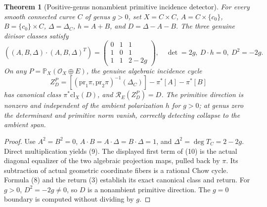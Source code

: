 \documentclass[11pt]{article}
\newtheorem{theorem}{Theorem}
\begin{document}
\begin{theorem}[Positive-genus nonambient primitive incidence detector]
For every smooth connected curve \(C\) of genus \(g>0\), set
\(X=C\times C\), \(A=C\times\{c_0\}\),
\(B=\{c_0\}\times C\), \(\Delta=\Delta_C\),
\(h=A+B\), and \(D=\Delta-A-B\).
The three genuine divisor classes satisfy
\[
 \left((A,B,\Delta)\cdot(A,B,\Delta)^T\right)
 =\begin{pmatrix}
 0&1&1\\ 1&0&1\\1&1&2-2g
 \end{pmatrix},\quad
 \boxed{\det=2g,\ D\cdot h=0,\ D^2=-2g.} \tag{9}
\]
On any \(P=\mathbb P_X(\mathcal O_X\oplus E)\), the
genuine algebraic incidence cycle
\[
 \boxed{Z_D^P=
 [( \mathrm{pr}_1\pi,\mathrm{pr}_2\pi)^{-1}(\Delta_C)]
 -\pi^*[A]-\pi^*[B]} \tag{10}
\]
has canonical class \(\pi^*\mathrm{cl}_X(D)\),
and \(\mathcal R_E(Z_D^P)=D\).
The primitive direction is nonzero and independent of the
ambient polarization \(h\) for \(g>0\); at genus zero the
determinant and primitive norm vanish, correctly detecting
collapse to the ambient span.
\end{theorem}
\begin{proof}
Use \(A^2=B^2=0\), \(A\cdot B=A\cdot\Delta
=B\cdot\Delta=1\), and
\(\Delta^2=\deg T_C=2-2g\). Direct multiplication yields
(9). The displayed first term of (10) is the actual diagonal
equalizer of the two algebraic projection maps, pulled back
by \(\pi\). Its subtraction of actual geometric coordinate
fibers is a rational Chow cycle. Formula (8) and the return
(3) establish its exact canonical class and return. For
\(g>0\), \(D^2=-2g\ne0\), so \(D\) is a nonambient
primitive direction. The \(g=0\) boundary is computed
without dividing by \(g\).
\end{proof}
\end{document}

